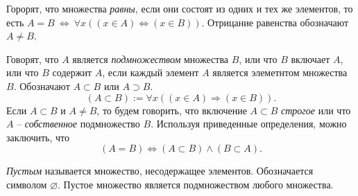 \documentclass[14pt, a4paper]{article}
\theoremstyle{definition}
\theoremstyle{remark}
\begin{document}
Горорят, что множества \textit{равны}, если они состоят из одних и тех же элементов, то есть $A = B \ \Leftrightarrow \ \forall x ((x \in A) \Leftrightarrow (x \in B))$.
Отрицание равенства обозначают $A \not = B$.

Говорят, что $A$ является \textit{подмножеством} множества $B$, или что $B$ включает $A$, или что $B$ содержит $A$, если каждый элемент $A$ является элеметнтом множества $B$. Обозначают $A \subset B$ или $A \supset B$.
$$(A \subset B) := \forall x ((x \in A) \Rightarrow (x \in B)).$$
Если $A \subset B$ и $A \not = B$, то будем говорить, что включение $A \subset B$ \textit{строгое} или что $A$ -- \textit{собственное} подмножество $B$. Используя приведенные определения, можно заключить, что
$$(A = B) \Leftrightarrow (A \subset B) \wedge (B \subset A).$$

\textit{Пустым} называется множество, несодержащее элементов. Обозначается символом $\varnothing$. Пустое множество является подмножеством любого множества.
\end{document}
